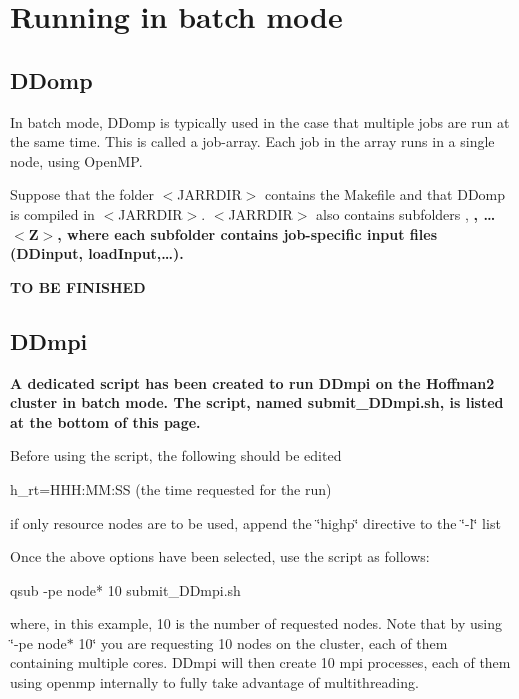 \subparagraph*{}\hypertarget{hoffman2_hoffma2_dd_batch}{}\section{Running in batch mode}\label{hoffman2_hoffma2_dd_batch}
\subparagraph*{}\hypertarget{hoffman2_hoffma2_dd_batch_DDomp}{}\subsection{D\+Domp}\label{hoffman2_hoffma2_dd_batch_DDomp}
In batch mode, D\+Domp is typically used in the case that multiple jobs are run at the same time. This is called a job-\/array. Each job in the array runs in a single node, using Open\+MP.

Suppose that the folder $<$\+J\+A\+R\+R\+D\+I\+R$>$ contains the Makefile and that D\+Domp is compiled in $<$\+J\+A\+R\+R\+D\+I\+R$>$. $<$\+J\+A\+R\+R\+D\+I\+R$>$ also contains subfolders , {\bfseries{, … $<$\+Z$>$, where each subfolder contains job-\/specific input files (D\+Dinput, load\+Input,…).}}

{\bfseries{TO BE F\+I\+N\+I\+S\+H\+ED}}

{\bfseries{\subparagraph*{}}}

{\bfseries{ }}\hypertarget{hoffman2_hoffma2_dd_batch_DDmpi}{}\subsection{D\+Dmpi}\label{hoffman2_hoffma2_dd_batch_DDmpi}
{\bfseries{ A dedicated script has been created to run D\+Dmpi on the Hoffman2 cluster in batch mode. The script, named submit\+\_\+\+D\+Dmpi.\+sh, is listed at the bottom of this page.}}

{\bfseries{Before using the script, the following should be edited
\begin{DoxyItemize}
\item h\+\_\+rt=H\+H\+H\+:\+MM\+:SS (the time requested for the run)
\item if only resource nodes are to be used, append the \char`\"{}highp\char`\"{} directive to the \char`\"{}-\/l\char`\"{} list
\end{DoxyItemize}}}

{\bfseries{Once the above options have been selected, use the script as follows\+: \begin{DoxyVerb}qsub -pe node* 10 submit_DDmpi.sh
\end{DoxyVerb}
 where, in this example, 10 is the number of requested nodes. Note that by using \char`\"{}-\/pe node$\ast$ 10\char`\"{} you are requesting 10 nodes on the cluster, each of them containing multiple cores. D\+Dmpi will then create 10 mpi processes, each of them using openmp internally to fully take advantage of multithreading.}}

